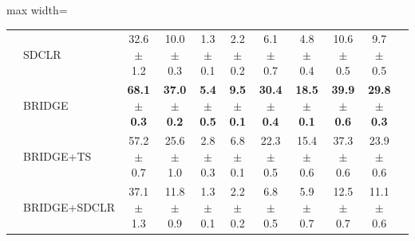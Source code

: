 \begin{table}[t]
\begin{adjustbox}{max width=\textwidth}
\begin{tabular}{l l c c c c c c c c c}
 & SDCLR & 32.6 {\scriptsize$\pm$ 1.2} & 10.0 {\scriptsize$\pm$ 0.3} & 1.3 {\scriptsize$\pm$ 0.1} & 2.2 {\scriptsize$\pm$ 0.2} & 6.1 {\scriptsize$\pm$ 0.7} & 4.8 {\scriptsize$\pm$ 0.4} & 10.6 {\scriptsize$\pm$ 0.5} & 9.7 {\scriptsize$\pm$ 0.5} \\
 & BRIDGE & \textbf{68.1 {\scriptsize$\pm$ 0.3}} & \textbf{37.0 {\scriptsize$\pm$ 0.2}} & \textbf{5.4 {\scriptsize$\pm$ 0.5}} & \textbf{9.5 {\scriptsize$\pm$ 0.1}} & \textbf{30.4 {\scriptsize$\pm$ 0.4}} & \textbf{18.5 {\scriptsize$\pm$ 0.1}} & \textbf{39.9 {\scriptsize$\pm$ 0.6}} & \textbf{29.8 {\scriptsize$\pm$ 0.3}} \\
 & BRIDGE+TS & 57.2 {\scriptsize$\pm$ 0.7} & 25.6 {\scriptsize$\pm$ 1.0} & 2.8 {\scriptsize$\pm$ 0.3} & 6.8 {\scriptsize$\pm$ 0.1} & 22.3 {\scriptsize$\pm$ 0.5} & 15.4 {\scriptsize$\pm$ 0.6} & 37.3 {\scriptsize$\pm$ 0.6} & 23.9 {\scriptsize$\pm$ 0.6} \\
 & BRIDGE+SDCLR & 37.1 {\scriptsize$\pm$ 1.3} & 11.8 {\scriptsize$\pm$ 0.9} & 1.3 {\scriptsize$\pm$ 0.1} & 2.2 {\scriptsize$\pm$ 0.2} & 6.8 {\scriptsize$\pm$ 0.5} & 5.9 {\scriptsize$\pm$ 0.7} & 12.5 {\scriptsize$\pm$ 0.7} & 11.1 {\scriptsize$\pm$ 0.6} \\
\bottomrule
\end{tabular}
\end{adjustbox}
\end{table}
